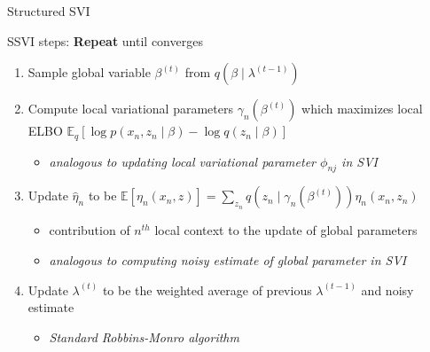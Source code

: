 \documentclass[aspectratio=169]{beamer}
\newenvironment{greytext}{\color{gray}}{\ignorespacesafterend}
\begin{document}
\begin{frame}{Structured SVI}
    \begin{block}{SSVI steps:}
        \textbf{Repeat} until converges
        \begin{enumerate}
            \item Sample global variable $\beta^{(t)}$ from $q(\beta \mid \lambda^{(t-1)})$
            \item Compute local variational parameters $\gamma_n(\beta^{(t)})$ which maximizes local ELBO
            $\mathbb{E}_q[\log p(x_n, z_n \mid \beta) - \log q(z_n \mid \beta)]$
            
            \begin{itemize}
                \begin{greytext}
                \item \textit{analogous to updating local variational parameter $\phi_{nj}$ in SVI}
                \end{greytext}
            \end{itemize}
            
            \item Update $\hat{\eta}_n$ to be $\mathbb{E}[\eta_n(x_n, z)] = \sum_{z_n}q(z_n \mid \gamma_n(\beta^{(t)}))\eta_n(x_n,z_n)$%
            
            \begin{itemize}
            \begin{greytext}
                \item contribution of $n^{th}$ local context to the update of global parameters
                \item \textit{analogous to computing noisy estimate of global parameter in SVI}
                \end{greytext}
            \end{itemize}
            
            
            \item Update $\lambda^{(t)}$ to be the weighted average of previous $\lambda^{(t-1)}$ and noisy estimate
            
            \begin{itemize}
                \begin{greytext}
                \item \textit{Standard Robbins-Monro algorithm}
                \end{greytext}
            \end{itemize}
            
            
        \end{enumerate}
    \end{block}
\end{frame}
\end{document}
